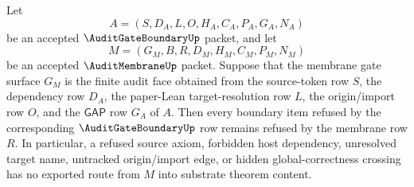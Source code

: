 \begin{theorem}
\label{thm:audit-gate-boundary-to-audit-membrane-refusal-bridge}
Let
$$
A=(S,D_A,L,O,H_A,C_A,P_A,G_A,N_A)
$$
be an accepted $\AuditGateBoundaryUp$ packet, and let
$$
M=(G_M,B,R,D_M,H_M,C_M,P_M,N_M)
$$
be an accepted $\AuditMembraneUp$ packet. Suppose that the membrane gate surface $G_M$ is the finite audit face obtained from the source-token row $S$, the dependency row $D_A$, the paper-Lean target-resolution row $L$, the origin/import row $O$, and the $\mathsf{GAP}$ row $G_A$ of $A$. Then every boundary item refused by the corresponding $\AuditGateBoundaryUp$ row remains refused by the membrane row $R$. In particular, a refused source axiom, forbidden host dependency, unresolved target name, untracked origin/import edge, or hidden global-correctness crossing has no exported route from $M$ into substrate theorem content.
\end{theorem}
